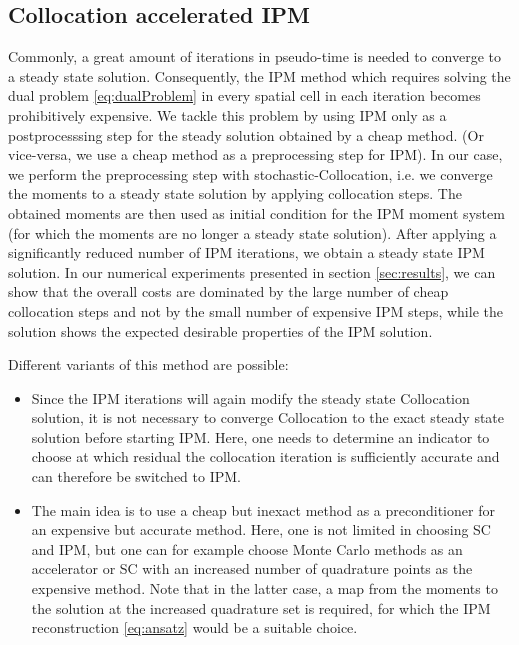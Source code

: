 \subsection{Collocation accelerated IPM}
\label{sec:collIPM}
Commonly, a great amount of iterations in pseudo-time is needed to converge to a steady state solution. Consequently, the IPM method which requires solving the dual problem \eqref{eq:dualProblem} in every spatial cell in each iteration becomes prohibitively expensive. We tackle this problem by using IPM only as a postprocesssing step for the steady solution obtained by a cheap method. (Or vice-versa, we use a cheap method as a preprocessing step for IPM). In our case, we perform the preprocessing step with stochastic-Collocation, i.e. we converge the moments to a steady state solution by applying collocation steps. The obtained moments are then used as initial condition for the IPM moment system (for which the moments are no longer a steady state solution). After applying a significantly reduced number of IPM iterations, we obtain a steady state IPM solution. In our numerical experiments presented in section \ref{sec:results}, we can show that the overall costs are dominated by the large number of cheap collocation steps and not by the small number of expensive IPM steps, while the solution shows the expected desirable properties of the IPM solution.

Different variants of this method are possible:
\begin{itemize}
\item Since the IPM iterations will again modify the steady state Collocation solution, it is not necessary to converge Collocation to the exact steady state solution before starting IPM. Here, one needs to determine an indicator to choose at which residual the collocation iteration is sufficiently accurate and can therefore be switched to IPM.
\item The main idea is to use a cheap but inexact method as a preconditioner for an expensive but accurate method. Here, one is not limited in choosing SC and IPM, but one can for example choose Monte Carlo methods as an accelerator or SC with an increased number of quadrature points as the expensive method. Note that in the latter case, a map from the moments to the solution at the increased quadrature set is required, for which the IPM reconstruction \eqref{eq:ansatz} would be a suitable choice.
\end{itemize}